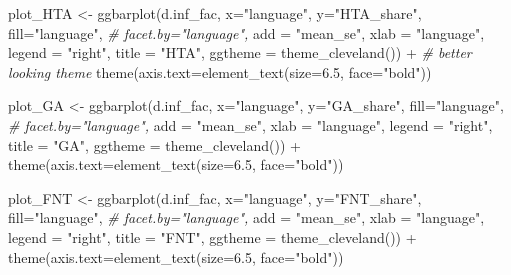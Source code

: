 \documentclass[
]{article}
\newenvironment{Shaded}{\begin{snugshade}}{\end{snugshade}}
\newcommand{\AttributeTok}[1]{\textcolor[rgb]{0.77,0.63,0.00}{#1}}
\newcommand{\CommentTok}[1]{\textcolor[rgb]{0.56,0.35,0.01}{\textit{#1}}}
\newcommand{\FloatTok}[1]{\textcolor[rgb]{0.00,0.00,0.81}{#1}}
\newcommand{\FunctionTok}[1]{\textcolor[rgb]{0.00,0.00,0.00}{#1}}
\newcommand{\NormalTok}[1]{#1}
\newcommand{\OtherTok}[1]{\textcolor[rgb]{0.56,0.35,0.01}{#1}}
\newcommand{\SpecialCharTok}[1]{\textcolor[rgb]{0.00,0.00,0.00}{#1}}
\newcommand{\StringTok}[1]{\textcolor[rgb]{0.31,0.60,0.02}{#1}}
\begin{document}
\begin{Shaded}
\begin{Highlighting}[]
\NormalTok{plot\_HTA }\OtherTok{\textless{}{-}} \FunctionTok{ggbarplot}\NormalTok{(d.inf\_fac, }\AttributeTok{x=}\StringTok{"language"}\NormalTok{, }\AttributeTok{y=}\StringTok{"HTA\_share"}\NormalTok{, }
                      \AttributeTok{fill=}\StringTok{"language"}\NormalTok{, }
              \CommentTok{\#        facet.by="language", }
                      \AttributeTok{add =} \StringTok{"mean\_se"}\NormalTok{,}
                      \AttributeTok{xlab =} \StringTok{"language"}\NormalTok{,}
                      \AttributeTok{legend =} \StringTok{"right"}\NormalTok{,}
                      \AttributeTok{title =} \StringTok{"HTA"}\NormalTok{,}
                      \AttributeTok{ggtheme =} \FunctionTok{theme\_cleveland}\NormalTok{()) }\SpecialCharTok{+} \CommentTok{\# better looking theme}
  \FunctionTok{theme}\NormalTok{(}\AttributeTok{axis.text=}\FunctionTok{element\_text}\NormalTok{(}\AttributeTok{size=}\FloatTok{6.5}\NormalTok{, }\AttributeTok{face=}\StringTok{"bold"}\NormalTok{))}

\NormalTok{plot\_GA }\OtherTok{\textless{}{-}} \FunctionTok{ggbarplot}\NormalTok{(d.inf\_fac, }\AttributeTok{x=}\StringTok{"language"}\NormalTok{, }\AttributeTok{y=}\StringTok{"GA\_share"}\NormalTok{, }
                      \AttributeTok{fill=}\StringTok{"language"}\NormalTok{, }
                \CommentTok{\#       facet.by="language", }
                      \AttributeTok{add =} \StringTok{"mean\_se"}\NormalTok{,}
                      \AttributeTok{xlab =} \StringTok{"language"}\NormalTok{,}
                      \AttributeTok{legend =} \StringTok{"right"}\NormalTok{,}
                      \AttributeTok{title =} \StringTok{"GA"}\NormalTok{,}
                      \AttributeTok{ggtheme =} \FunctionTok{theme\_cleveland}\NormalTok{()) }\SpecialCharTok{+}
  \FunctionTok{theme}\NormalTok{(}\AttributeTok{axis.text=}\FunctionTok{element\_text}\NormalTok{(}\AttributeTok{size=}\FloatTok{6.5}\NormalTok{, }\AttributeTok{face=}\StringTok{"bold"}\NormalTok{))}

\NormalTok{plot\_FNT }\OtherTok{\textless{}{-}} \FunctionTok{ggbarplot}\NormalTok{(d.inf\_fac, }\AttributeTok{x=}\StringTok{"language"}\NormalTok{, }\AttributeTok{y=}\StringTok{"FNT\_share"}\NormalTok{, }
                      \AttributeTok{fill=}\StringTok{"language"}\NormalTok{, }
                    \CommentTok{\#  facet.by="language", }
                      \AttributeTok{add =} \StringTok{"mean\_se"}\NormalTok{,}
                      \AttributeTok{xlab =} \StringTok{"language"}\NormalTok{,}
                      \AttributeTok{legend =} \StringTok{"right"}\NormalTok{,}
                      \AttributeTok{title =} \StringTok{"FNT"}\NormalTok{,}
                      \AttributeTok{ggtheme =} \FunctionTok{theme\_cleveland}\NormalTok{()) }\SpecialCharTok{+}
  \FunctionTok{theme}\NormalTok{(}\AttributeTok{axis.text=}\FunctionTok{element\_text}\NormalTok{(}\AttributeTok{size=}\FloatTok{6.5}\NormalTok{, }\AttributeTok{face=}\StringTok{"bold"}\NormalTok{))}



\end{Highlighting}
\end{Shaded}
\end{document}
